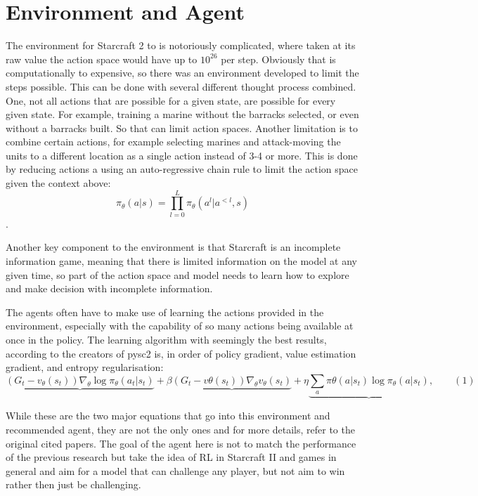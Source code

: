 \section{Environment and Agent}
\label{sec:Environment and Agent}

The environment for Starcraft 2 to is notoriously complicated, where taken at its raw value the action space would have up to $10^{26}$ per step. Obviously that is computationally to expensive, so there was an environment developed to limit the steps possible. This
can be done with several different thought process combined. One, not all actions that are possible for a given state, are possible for every given state. For example, training a marine without the barracks selected, or even without a barracks built. So that 
can limit action spaces. Another limitation is to combine certain actions, for example selecting marines and attack-moving the units to a different location as a single action instead of 3-4 or more. This is done by reducing actions a using an auto-regressive
chain rule to limit the action space given the context above\cite{starcraft_unplugged}: $$\pi_{\theta}(a|s) = \prod\limits_{l=0}^{L} \pi_{\theta}(a^l|a^{<l}, s)$$.

Another key component to the environment is that Starcraft is an incomplete information game, meaning that there is limited information on the model at any given time, so part of the action space and model needs to learn how to explore and make decision with
incomplete information. 

The agents often have to make use of learning the actions provided in the environment, especially with the capability of so many actions being available at once in the policy. The learning algorithm with seemingly the best results, according to the creators of
pysc2 is, in order of policy gradient, value estimation gradient, and entropy regularisation: 
$$\underbrace{(G_t - v_\theta(s_t))  \nabla_\theta \log \pi_\theta(a_t|s_t)} + \beta \underbrace{(G_t - v\theta(s_t)) \nabla_\theta v_\theta(s_t)} + \eta \underbrace{\sum_a \pi\theta(a|s_t) \log \pi_\theta(a|s_t)}, \qquad (1)$$

While these are the two major equations that go into this environment and recommended agent, they are not the only ones and for more details, refer to the original cited papers. The goal of the agent here is not to match the performance of the previous research
but take the idea of RL in Starcraft II and games in general and aim for a model that can challenge any player, but not aim to win rather then just be challenging.
